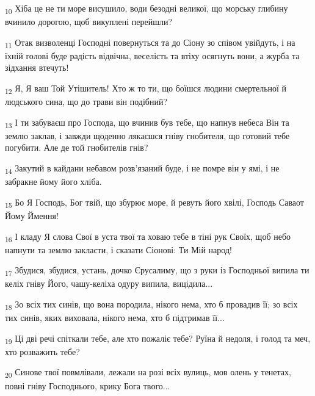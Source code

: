 \begin{tcolorbox}
\textsubscript{10} Хіба це не ти море висушило, води безодні великої, що морську глибину вчинило дорогою, щоб викуплені перейшли?
\end{tcolorbox}
\begin{tcolorbox}
\textsubscript{11} Отак визволенці Господні повернуться та до Сіону зо співом увійдуть, і на їхній голові буде радість відвічна, веселість та втіху осягнуть вони, а журба та зідхання втечуть!
\end{tcolorbox}
\begin{tcolorbox}
\textsubscript{12} Я, Я ваш Той Утішитель! Хто ж то ти, що боїшся людини смертельної й людського сина, що до трави він подібний?
\end{tcolorbox}
\begin{tcolorbox}
\textsubscript{13} І ти забуваєш про Господа, що вчинив був тебе, що напнув небеса Він та землю заклав, і завжди щоденно лякаєшся гніву гнобителя, що готовий тебе погубити. Але де той гнобителів гнів?
\end{tcolorbox}
\begin{tcolorbox}
\textsubscript{14} Закутий в кайдани небавом розв'язаний буде, і не помре він у ямі, і не забракне йому його хліба.
\end{tcolorbox}
\begin{tcolorbox}
\textsubscript{15} Бо Я Господь, Бог твій, що збурює море, й ревуть його хвілі, Господь Саваот Йому Ймення!
\end{tcolorbox}
\begin{tcolorbox}
\textsubscript{16} І кладу Я слова Свої в уста твої та ховаю тебе в тіні рук Своїх, щоб небо напнути та землю закласти, і сказати Сіонові: Ти Мій народ!
\end{tcolorbox}
\begin{tcolorbox}
\textsubscript{17} Збудися, збудися, устань, дочко Єрусалиму, що з руки із Господньої випила ти келіх гніву Його, чашу-келіха одуру випила, вицідила...
\end{tcolorbox}
\begin{tcolorbox}
\textsubscript{18} Зо всіх тих синів, що вона породила, нікого нема, хто б провадив її; зо всіх тих синів, яких виховала, нікого нема, хто б підтримав її...
\end{tcolorbox}
\begin{tcolorbox}
\textsubscript{19} Ці дві речі спіткали тебе, але хто пожаліє тебе? Руїна й недоля, і голод та меч, хто розважить тебе?
\end{tcolorbox}
\begin{tcolorbox}
\textsubscript{20} Синове твої повмлівали, лежали на розі всіх вулиць, мов олень у тенетах, повні гніву Господнього, крику Бога твого...
\end{tcolorbox}
